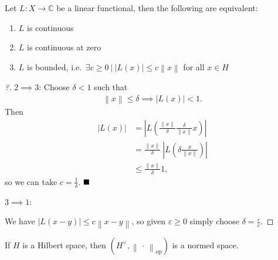 \begin{theorem}

Let \(L:X \to {\mathbb{C}}\) be a linear functional, then the following
are equivalent:

\begin{enumerate}
\def\labelenumi{\arabic{enumi}.}
\tightlist
\item
  \(L\) is continuous
\item
  \(L\) is continuous at zero
\item
  \(L\) is bounded,
  i.e.~\(\exists c\geq 0 {~\mathrel{\Big|}~}{\left\lvert {L(x)} \right\rvert} \leq c {\left\lVert {x} \right\rVert}\)
  for all \(x\in H\)
\end{enumerate}

\end{theorem}

\begin{proof}[?]

\(2 \implies 3\): Choose \(\delta < 1\) such that
\begin{align*}
{\left\lVert {x} \right\rVert} \leq \delta \implies {\left\lvert {L(x)} \right\rvert} < 1.
\end{align*}
Then
\begin{align*}
{\left\lvert {L(x)} \right\rvert} 
&= {\left\lvert {L\left( \frac{{\left\lVert {x} \right\rVert}}{\delta} \frac{\delta }{{\left\lVert {x} \right\rVert}} x \right)} \right\rvert} \\
&= \frac{{\left\lVert {x} \right\rVert}}{\delta} ~{\left\lvert {L\left( \delta \frac{x }{{\left\lVert {x} \right\rVert}} \right)} \right\rvert} \\
&\leq \frac{{\left\lVert {x} \right\rVert}}{\delta} 1
,\end{align*}
so we can take \(c = \frac 1 \delta\). \(\hfill\blacksquare\)

\(3 \implies 1\):

We have
\({\left\lvert {L(x-y)} \right\rvert} \leq c{\left\lVert {x-y} \right\rVert}\),
so given \(\varepsilon \geq 0\) simply choose
\(\delta = \frac \varepsilon c\).

\end{proof}

\begin{theorem}

If \(H\) is a Hilbert space, then
\((H^\vee, {\left\lVert {{\,\cdot\,}} \right\rVert}_{\text{op}})\) is a
normed space.

\end{theorem}

